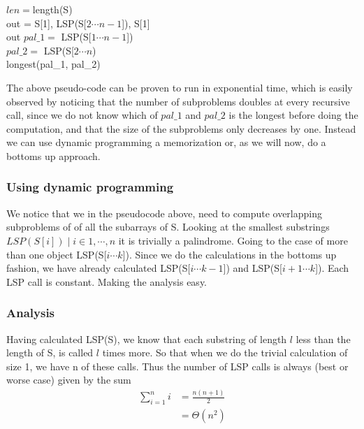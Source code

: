 \documentclass[11pt,english]{article}
\begin{document}
\begin{algorithm}
	
	\BlankLine
	
	$len = $length(S) \\
	{   
	    out = S[1], LSP(S[$2 \cdots n-1$]), S[1] \\
		\Return out
	}	
	$pal\_1 =$ LSP(S[$1 \cdots n-1$]) \\
	$pal\_2 =$ LSP(S[$2 \cdots n$) \\
	\Return longest(pal\_1, pal\_2)
\end{algorithm}

\noindent
The above pseudo-code can be proven to run in exponential time, which is easily observed by noticing that the number of subproblems doubles at every recursive call, since we do not know which of $pal\_1$ and $pal\_2$ is the longest before doing the computation, and that the size of the subproblems only decreases by one. Instead we can use dynamic programming a memorization or, as we will now, do a bottoms up approach.

\subsubsection*{Using dynamic programming}

We notice that we in the pseudocode above, need to compute overlapping subproblems of of all the subarrays of S. Looking at the smallest substrings $LSP(S[i]) \mid i \in {1,\cdots, n}$ it is trivially a palindrome. Going to the case of more than one object LSP(S[$i \cdots k$]). Since we do the calculations in the bottoms up fashion, we have already calculated LSP(S[$i \cdots k-1$]) and LSP(S[$i+1 \cdots k$]). Each LSP call is constant. Making the analysis easy.

\subsubsection*{Analysis}

Having calculated LSP(S), we know that each substring of length $l$ less than the length of S, is called $l$ times more. So that when we do the trivial calculation of size 1, we have n of these calls. Thus the number of LSP calls is always (best or worse case) given by the sum
\begin{align*}
\sum_{i = 1}^n i &= \frac{n(n+1)}{2} \\
&= \Theta(n^2)
\end{align*}







\end{document}
